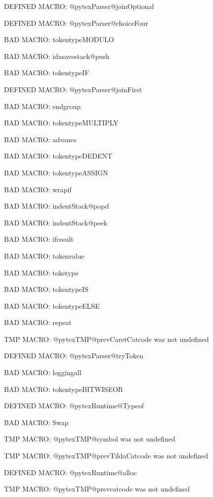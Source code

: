 \ifx\@pytexParser@joinOptional\undefined\else DEFINED MACRO: @pytexParser@joinOptional
\fi

\ifx\@pytexParser@choiceFour\undefined\else DEFINED MACRO: @pytexParser@choiceFour
\fi

BAD MACRO: tokentypeMODULO

BAD MACRO: idxsavestack@push

BAD MACRO: tokentypeIF

\ifx\@pytexParser@joinFirst\undefined\else DEFINED MACRO: @pytexParser@joinFirst
\fi

BAD MACRO: endgroup

BAD MACRO: tokentypeMULTIPLY

BAD MACRO: advance

BAD MACRO: tokentypeDEDENT

BAD MACRO: tokentypeASSIGN

BAD MACRO: wrapif

BAD MACRO: indentStack@popd

BAD MACRO: indentStack@peek

BAD MACRO: ifresult

BAD MACRO: tokenvalue

BAD MACRO: toketype

BAD MACRO: tokentypeIS

BAD MACRO: tokentypeELSE

BAD MACRO: repeat

\ifx\@pytexTMP@prevCaretCatcode\undefined\else TMP MACRO: @pytexTMP@prevCaretCatcode was not undefined
\fi

\ifx\@pytexParser@tryToken\undefined\else DEFINED MACRO: @pytexParser@tryToken
\fi

BAD MACRO: loggingall

BAD MACRO: tokentypeBITWISEOR

\ifx\@pytexRuntime@Typeof\undefined\else DEFINED MACRO: @pytexRuntime@Typeof
\fi

BAD MACRO: Swap

\ifx\@pytexTMP@symbol\undefined\else TMP MACRO: @pytexTMP@symbol was not undefined
\fi

\ifx\@pytexTMP@prevTildaCatcode\undefined\else TMP MACRO: @pytexTMP@prevTildaCatcode was not undefined
\fi

\ifx\@pytexRuntime@alloc\undefined\else DEFINED MACRO: @pytexRuntime@alloc
\fi

\ifx\@pytexTMP@prevcatcode\undefined\else TMP MACRO: @pytexTMP@prevcatcode was not undefined
\fi

